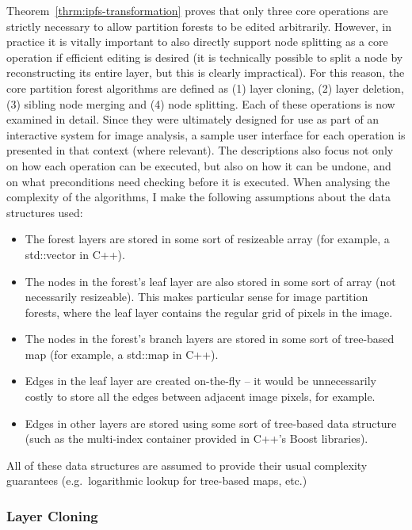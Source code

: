 \noindent Theorem~\ref{thrm:ipfs-transformation} proves that only three core operations are strictly necessary to allow partition forests to be edited arbitrarily. However, in practice it is vitally important to also directly support node splitting as a core operation if efficient editing is desired (it is technically possible to split a node by reconstructing its entire layer, but this is clearly impractical). For this reason, the core partition forest algorithms are defined as (1) layer cloning, (2) layer deletion, (3) sibling node merging and (4) node splitting. Each of these operations is now examined in detail. Since they were ultimately designed for use as part of an interactive system for image analysis, a sample user interface for each operation is presented in that context (where relevant). The descriptions also focus not only on how each operation can be executed, but also on how it can be undone, and on what preconditions need checking before it is executed. When analysing the complexity of the algorithms, I make the following assumptions about the data structures used:

\begin{itemize}
\item The forest layers are stored in some sort of resizeable array (for example, a std::vector in C++).
\item The nodes in the forest's leaf layer are also stored in some sort of array (not necessarily resizeable). This makes particular sense for image partition forests, where the leaf layer contains the regular grid of pixels in the image.
\item The nodes in the forest's branch layers are stored in some sort of tree-based map (for example, a std::map in C++).
\item Edges in the leaf layer are created on-the-fly -- it would be unnecessarily costly to store all the edges between adjacent image pixels, for example.
\item Edges in other layers are stored using some sort of tree-based data structure (such as the multi-index container provided in C++'s Boost libraries).
\end{itemize}

\noindent All of these data structures are assumed to provide their usual complexity guarantees (e.g.~logarithmic lookup for tree-based maps, etc.)

\subsubsection{Layer Cloning}

